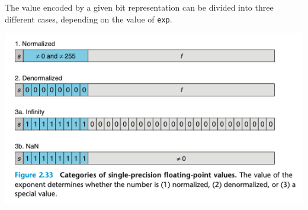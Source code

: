 \documentclass[11pt]{article}
\begin{document}
The value encoded by a given bit representation can be divided into three different cases, depending on the value of \texttt{exp}.\\

\begin{center}
\includegraphics[width=.9\linewidth]{pics/categories-of-single-precision-floating-point-values.png}
\end{center}
\end{document}
